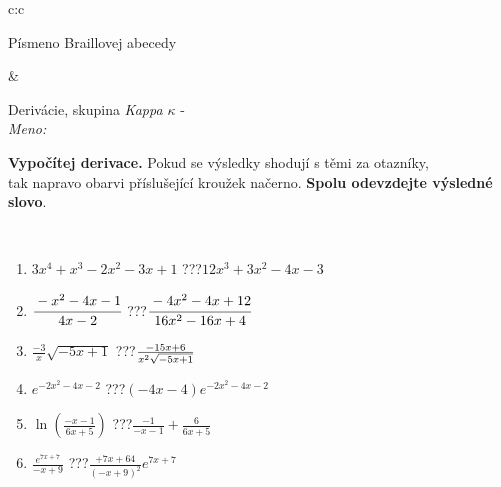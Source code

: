 \documentclass[10pt]{report}
\begin{document}
\begin{tabular}{c:c}
\begin{minipage}[c][104.5mm][t]{0.5\linewidth}
\begin{center}
\begin{minipage}{0.20\linewidth}
\begin{center}
{\small Písmeno Braillovej abecedy}
\end{center}
\end{minipage}
\end{center}
\end{minipage}
&
\begin{minipage}[c][104.5mm][t]{0.5\linewidth}
\begin{center}
\vspace{7mm}
{\huge Derivácie, skupina \textit{Kappa $\kappa$} -}\\[5mm]
\textit{Meno:}\phantom{xxxxxxxxxxxxxxxxxxxxxxxxxxxxxxxxxxxxxxxxxxxxxxxxxxxxxxxxxxxxxxxxx}\\[5mm]
\begin{minipage}{0.95\linewidth}
\begin{center}
\textbf{Vypočítej derivace.} Pokud se výsledky shodují s těmi za otazníky,\\tak napravo obarvi příslušející kroužek načerno. \textbf{Spolu odevzdejte výsledné slovo}.
\end{center}
\end{minipage}
\\[1mm]
\begin{minipage}{0.79\linewidth}
\begin{center}
\begin{varwidth}{\linewidth}
\begin{enumerate}
\normalsize
\item $3x^4+x^3-2x^2-3x+1$\quad \dotfill\; ???\;\dotfill \quad $12x^3+3x^2-4x-3$
\item $\cfrac{-x^2-4x-1}{4x-2}$\quad \dotfill\; ???\;\dotfill \quad $\cfrac{-4x^2-4x+12}{16x^2-16x+4}$
\item $\frac{-3}{x}\sqrt{-5x+1}$\quad \dotfill\; ???\;\dotfill \quad $\frac{-15x+6}{x^2 \sqrt{\smash[b]{-5x+1}}}$
\item $e^{-2x^2-4x-2}$\quad \dotfill\; ???\;\dotfill \quad $(-4x-4)e^{-2x^2-4x-2}$
\item $\ln{\left(\frac{-x-1}{6x+5}\right)}$\quad \dotfill\; ???\;\dotfill \quad $\frac{-1}{-x-1}+\frac{6}{6x+5}$
\item $\frac{e^{7x+7}}{-x+9}$\quad \dotfill\; ???\;\dotfill \quad $\frac{+7x+64}{(-x+9)^2}e^{7x+7}$
\end{enumerate}
\end{varwidth}
\end{center}
\end{minipage}
\begin{minipage}{0.20\linewidth}
\begin{center}

\end{center}
\end{minipage}
\end{center}
\end{minipage}
\end{tabular}
\end{document}

